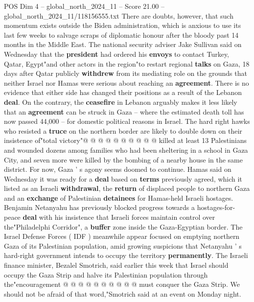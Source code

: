 \begin{textsample}{POS Dim 4 – global\_north\_2024\_11 – Score 21.00 – global\_north\_2024\_11/118156555.txt}  \label{ex:f4_pos_283}
There are doubts, however, that such momentum exists outside the Biden administration, which is anxious to use its last few weeks to salvage scraps of diplomatic honour after the bloody past 14 months in the Middle East.
The national security adviser Jake Sullivan said on Wednesday that the \textbf{president} had ordered his \textbf{envoys} to contact Turkey, Qatar, Egypt"and other actors in the region"to restart regional \textbf{talks} on Gaza, 18 days after Qatar publicly \textbf{withdrew} from its mediating role on the grounds that neither Israel nor Hamas were serious about reaching an \textbf{agreement}.
There is no evidence that either side has changed their positions as a result of the Lebanon \textbf{deal}.
On the contrary, the \textbf{ceasefire} in Lebanon arguably makes it less likely that an \textbf{agreement} can be struck in Gaza -- where the estimated death toll has now passed 44,000 -- for domestic political reasons in Israel.
The hard right hawks who resisted a \textbf{truce} on the northern border are likely to double down on their insistence of"total victory"@ @ @ @ @ @ @ @ @ @ killed at least 13 Palestinians and wounded dozens among families who had been sheltering in a school in Gaza City, and seven more were killed by the bombing of a nearby house in the same district.
For now, Gaza ' s agony seems doomed to continue.
Hamas said on Wednesday it was ready for a \textbf{deal} based on \textbf{terms} previously agreed, which it listed as an Israeli \textbf{withdrawal}, the \textbf{return} of displaced people to northern Gaza and an \textbf{exchange} of Palestinian \textbf{detainees} for Hamas-held Israeli hostages.
Benjamin Netanyahu has previously blocked progress towards a hostages-for-peace \textbf{deal} with his insistence that Israeli forces maintain control over the"Philadelphi Corridor", a \textbf{buffer} zone inside the Gaza-Egyptian border.
The Israel Defense Forces ( IDF ) meanwhile appear focused on emptying northern Gaza of its Palestinian population, amid growing suspicions that Netanyahu ' s hard-right government intends to occupy the territory \textbf{permanently}.
The Israeli finance minister, Bezalel Smotrich, said earlier this week that Israel should occupy the Gaza Strip and halve its Palestinian population through the"encouragement @ @ @ @ @ @ @ @ @ @ must conquer the Gaza Strip.
We should not be afraid of that word,"Smotrich said at an event on Monday night.

\end{textsample}
